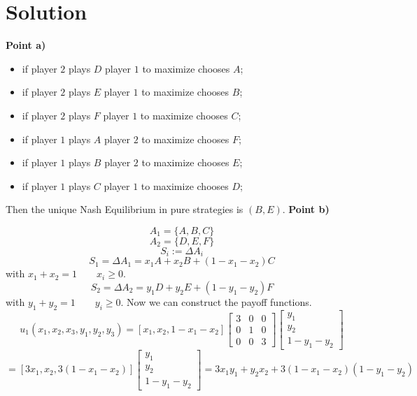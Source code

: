 \documentclass[a4paper, twoside, openany]{book}
\begin{document}
\section*{Solution}
\textbf{Point a)} \par 
\begin{itemize}
\item if player $2$ plays $D$ player $1$ to maximize chooses $A$;
\item if player $2$ plays $E$ player $1$ to maximize chooses $B$;
\item if player $2$ plays $F$ player $1$ to maximize chooses $C$;
\end{itemize}
\begin{itemize}
\item if player $1$ plays $A$ player $2$ to maximize chooses $F$;
\item if player $1$ plays $B$ player $2$ to maximize chooses $E$;
\item if player $1$ plays $C$ player $1$ to maximize chooses $D$;
\end{itemize}
Then the unique Nash Equilibrium in pure strategies is $(B, E)$.
\textbf{Point b)} \par  
$$A_1 = \{ A, B, C \}$$
$$A_2 = \{ D, E, F \}$$
$$S_i:= \Delta A_i$$
$$S_1 = \Delta A_1 = x_1 A + x_2 B + (1 - x_1 - x_2) C$$
with $x_1 + x_2 = 1 \qquad x_i \geq 0$.
$$S_2 = \Delta A_2 = y_1 D + y_2 E + (1 - y_1 - y_2) F$$
with $y_1 + y_2 = 1 \qquad y_i \geq 0$.
Now we can construct the payoff functions.
$$u_1(x_1, x_2, x_3, y_1, y_2, y_3) = [x_1, x_2, 1 - x_1 - x_2] \begin{bmatrix}
																	3 & 0 & 0 \\
																	0 & 1 & 0 \\
																	0 & 0 & 3 
                                                                \end{bmatrix} \begin{bmatrix}
                                                                y_1 \\
                                                                y_2 \\
                                                                1 - y_1 - y_2
                                                                \end{bmatrix}$$
$$= [3 x_1, x_2, 3(1 - x_1 - x_2)] \begin{bmatrix}
									y_1 \\
									y_2 \\
									1 - y_1 - y_2
								  \end{bmatrix} = 3 x_1 y_1 + y_2 x_2 + 3(1 - x_1 - x_2)(1 - y_1 - y_2)$$
\end{document}
